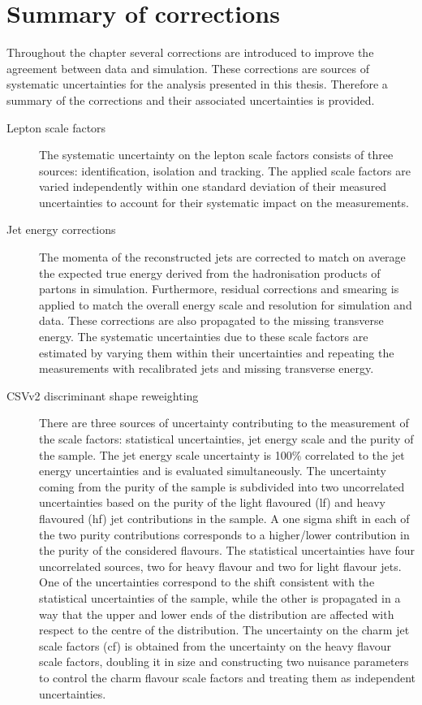 \section{Summary of corrections}
\label{sec:SummaryCor}
Throughout the chapter several corrections are introduced to improve the agreement between data and simulation. These corrections are sources of systematic uncertainties for the analysis presented in this thesis. Therefore a summary of the corrections and their associated uncertainties is provided. 
\begin{description}
  		\item[Lepton scale factors] The systematic uncertainty on the lepton scale factors consists of three sources: identification, isolation and tracking.	The applied scale factors are varied independently within one standard deviation of their measured uncertainties to account for their systematic impact on the measurements. 

	\item[Jet energy corrections] The momenta of the reconstructed jets are corrected to match on average the expected true energy derived from the hadronisation products of partons in simulation. Furthermore, residual corrections and smearing is applied to match the overall energy scale and resolution for simulation and data. These corrections are also propagated to the missing transverse energy. The systematic uncertainties due to these scale factors are estimated by varying them within their uncertainties and repeating the measurements with recalibrated jets and missing transverse energy. 
	

	
	\item[CSVv2 discriminant shape reweighting] There are three sources of uncertainty contributing to the measurement of the scale factors: statistical uncertainties, jet energy scale and the purity of the sample. The jet energy scale uncertainty is 100\% correlated to the jet energy uncertainties and is evaluated simultaneously. The uncertainty coming from the purity of the sample is subdivided into two uncorrelated uncertainties based on the purity of the light flavoured (lf) and heavy flavoured (hf) jet contributions in the sample. A one sigma shift in each of the two purity contributions corresponds to a higher/lower contribution in the purity of the considered flavours. The statistical uncertainties have four uncorrelated sources, two for heavy flavour and two for light flavour jets. One of the uncertainties correspond to the shift consistent with the statistical uncertainties of the sample, while the other is propagated in a way that the upper and lower ends of the distribution are affected with respect to the centre of the distribution.   The uncertainty on the charm jet scale factors (cf)   is obtained from the uncertainty on the heavy flavour scale factors, doubling it in size and constructing two nuisance parameters to control the charm flavour scale factors and treating them as independent uncertainties. 
	

\end{description}
